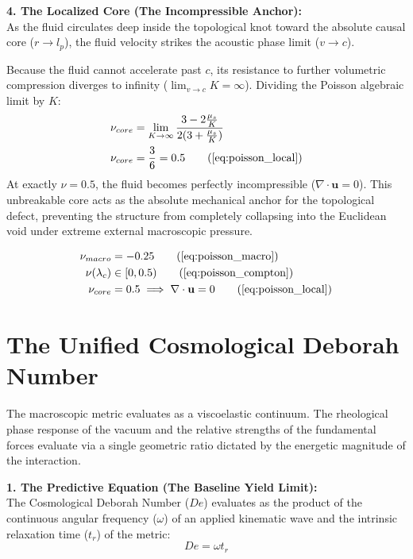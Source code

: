\documentclass[11pt, a4paper]{article}
\begin{document}
\textbf{4. The Localized Core (The Incompressible Anchor):} \\
As the fluid circulates deep inside the topological knot toward the absolute causal core ($r \to l_p$), the fluid velocity strikes the acoustic phase limit ($v \to c$).

Because the fluid cannot accelerate past $c$, its resistance to further volumetric compression diverges to infinity ($\lim_{v \to c} K = \infty$). Dividing the Poisson algebraic limit by $K$:
\begin{align}
    \nu_{core} &= \lim_{K \to \infty} \frac{3 - 2\frac{\mu_s}{K}}{2(3 + \frac{\mu_s}{K})}  \\
    \nu_{core} &= \frac{3}{6} = 0.5 \tag{\ref{eq:poisson_local}}
\end{align}
At exactly $\nu = 0.5$, the fluid becomes perfectly incompressible ($\nabla \cdot \mathbf{u} = 0$). This unbreakable core acts as the absolute mechanical anchor for the topological defect, preventing the structure from completely collapsing into the Euclidean void under extreme external macroscopic pressure.

\begin{tcolorbox}[recallbox, title={\ref{box:rheological_gradient}. The Rheological Gradient}]
\begin{align}
    \nu_{macro} &= -0.25 \tag{\ref{eq:poisson_macro}} \\
    \nu(\lambda_c) &\in [0, 0.5) \tag{\ref{eq:poisson_compton}} \\
    \nu_{core} &= 0.5 \implies \nabla \cdot \mathbf{u} = 0 \tag{\ref{eq:poisson_local}}
\end{align}
\end{tcolorbox}

\section{The Unified Cosmological Deborah Number}
\label{sec:deriv_unified_deborah}

The macroscopic metric evaluates as a viscoelastic continuum. The rheological phase response of the vacuum and the relative strengths of the fundamental forces evaluate via a single geometric ratio dictated by the energetic magnitude of the interaction.

\textbf{1. The Predictive Equation (The Baseline Yield Limit):} \\
The Cosmological Deborah Number ($De$) evaluates as the product of the continuous angular frequency ($\omega$) of an applied kinematic wave and the intrinsic relaxation time ($t_r$) of the metric:
\begin{equation}
    De = \omega t_r \nonumber
\end{equation}
\end{document}
